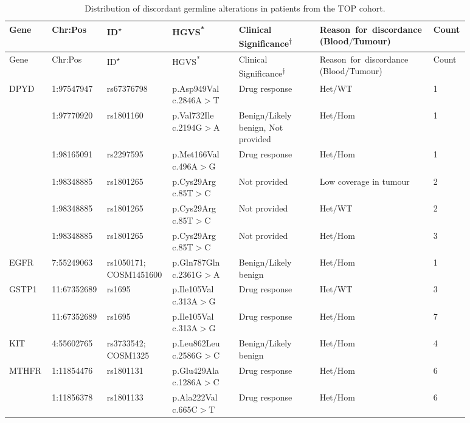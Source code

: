 \newpage
\begin{landscape}

\begin{longtable}{p{0.09\linewidth}|p{0.1\linewidth}p{0.12\linewidth}p{0.14\linewidth}p{0.17\linewidth}p{0.2\linewidth}p{0.06\linewidth}}
\caption{Distribution of discordant germline alterations in patients from the TOP cohort.}
\label{tbl:freq_discordant_germline}
		\\
		\hline
		Gene & Chr:Pos & ID\textsuperscript{$\star$} & HGVS\textsuperscript{*} & Clinical Significance\textsuperscript{$\dagger$} & \hbox{Reason for discordance} (Blood$/$Tumour) & Count
		\\
		\hline
    \endfirsthead
    \hline
		Gene & Chr:Pos & ID\textsuperscript{$\star$} & HGVS\textsuperscript{*} & Clinical Significance\textsuperscript{$\dagger$} & \hbox{Reason for discordance} (Blood$/$Tumour) & Count
		\\
		\hline
    \endhead
		DPYD & 1:97547947 & rs67376798 & p.Asp949Val c.2846A$>$T & Drug response & Het$/$WT & 1
		\\
		& 1:97770920 & rs1801160 & p.Val732Ile c.2194G$>$A & Benign$/$Likely benign, Not provided & Het$/$Hom & 1
		\\
		& 1:98165091 & rs2297595 & p.Met166Val c.496A$>$G & Drug response &  Het$/$Hom & 1
		\\
		& 1:98348885 & rs1801265 & p.Cys29Arg c.85T$>$C & Not provided & Low coverage in tumour & 2
		\\
		& 1:98348885 & rs1801265 & p.Cys29Arg c.85T$>$C & Not provided & Het$/$WT & 2
		\\
		& 1:98348885 & rs1801265 & p.Cys29Arg c.85T$>$C & Not provided & Het$/$Hom & 3
		\\
		\hline
		EGFR & 7:55249063 & rs1050171; COSM1451600 & p.Gln787Gln c.2361G$>$A & Benign$/$Likely benign & Het$/$Hom & 1
		\\
		\hline
		GSTP1 & 11:67352689 & rs1695 & p.Ile105Val c.313A$>$G & Drug response & Het$/$WT & 3
		\\
		& 11:67352689 & rs1695 & p.Ile105Val c.313A$>$G & Drug response & Het$/$Hom & 7
		\\
		\hline
		KIT & 4:55602765 & rs3733542; COSM1325 & p.Leu862Leu c.2586G$>$C & Benign$/$Likely benign & Het$/$Hom & 4
		\\
		\hline
		MTHFR & 1:11854476 & rs1801131 & p.Glu429Ala c.1286A$>$C & Drug response & Het$/$Hom & 6
		\\
		& 1:11856378 & rs1801133 & p.Ala222Val c.665C$>$T & Drug response & Het$/$Hom & 6

\end{longtable}
\end{landscape}
